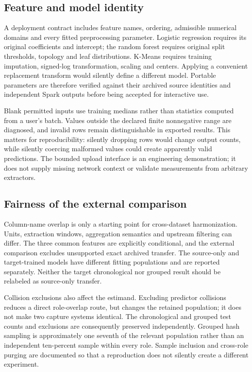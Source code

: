 \documentclass[conference]{IEEEtran}
\begin{document}
\subsection{Feature and model identity}
A deployment contract includes feature names, ordering, admissible numerical domains and every fitted preprocessing parameter. Logistic regression requires its original coefficients and intercept; the random forest requires original split thresholds, topology and leaf distributions. K-Means requires training imputation, signed-log transformation, scaling and centers. Applying a convenient replacement transform would silently define a different model. Portable parameters are therefore verified against their archived source identities and independent Spark outputs before being accepted for interactive use.

Blank permitted inputs use training medians rather than statistics computed from a user's batch. Values outside the declared finite nonnegative range are diagnosed, and invalid rows remain distinguishable in exported results. This matters for reproducibility: silently dropping rows would change output counts, while silently coercing malformed values could create apparently valid predictions. The bounded upload interface is an engineering demonstration; it does not supply missing network context or validate measurements from arbitrary extractors.

\subsection{Fairness of the external comparison}
Column-name overlap is only a starting point for cross-dataset harmonization. Units, extraction windows, aggregation semantics and upstream filtering can differ. The three common features are explicitly conditional, and the external comparison excludes unsupported exact archived transfer. The source-only and target-trained models have different fitting populations and are reported separately. Neither the target chronological nor grouped result should be relabeled as source-only transfer.

Collision exclusions also affect the estimand. Excluding predictor collisions reduces a direct role-overlap route, but changes the retained population; it does not make two capture systems identical. The chronological and grouped test counts and exclusions are consequently preserved independently. Grouped hash sampling is approximately one seventh of the relevant population rather than an independent ten-percent sample within every role. Sample inclusion and cross-role purging are documented so that a reproduction does not silently create a different experiment.
\end{document}
